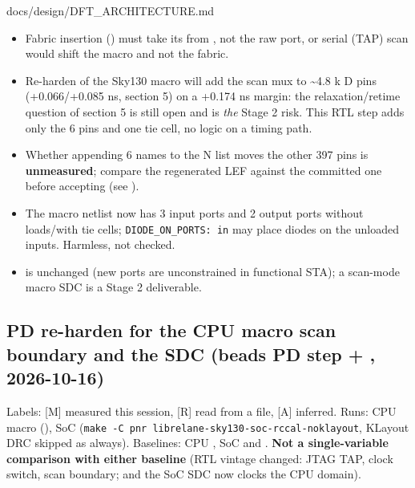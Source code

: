 \begin{relocated}{docs/design/DFT_ARCHITECTURE.md}
\begin{itemize}
\tightlist
\item
  Fabric insertion () must take its  from
  , not the raw  port, or serial (TAP)
  scan would shift the macro and not the fabric.
\item
  Re-harden of the Sky130 macro will add the scan mux to
  \textasciitilde4.8 k D pins (+0.066/\allowbreak{}+0.085 ns, section 5)
  on a +0.174 ns margin: the relaxation/\allowbreak{}retime question of
  section 5 is still open and is \emph{the} Stage 2 risk. This RTL step
  adds only the 6 pins and one tie cell, no logic on a timing path.
\item
  Whether appending 6 names to the N list moves the other 397 pins is
  \textbf{unmeasured}; compare the regenerated LEF against the committed
  one before accepting (see ).
\item
  The macro netlist now has 3 input ports and 2 output ports without
  loads/\allowbreak{}with tie cells;
  \texttt{DIODE\_\allowbreak{}ON\_\allowbreak{}PORTS:\allowbreak{}\ in}
  may place diodes on the unloaded inputs. Harmless, not checked.
\item
   is unchanged (new ports are unconstrained in
  functional STA); a scan-mode macro SDC is a Stage 2 deliverable.
\end{itemize}

\subsection{\texorpdfstring{PD re-harden for the CPU macro scan
boundary and the  SDC (beads  PD step +
,
2026-10-16)}{PD re-harden for the CPU macro scan boundary and the  SDC (beads  PD step + , 2026-10-16)}}\label{tm:ch:dft-architecture:1411-pd-re-harden-for-the-cpu-macro-scan-boundary-and-the-cpu-clk-i-sdc-beads-j41m4-pd-step-j41m5-2026-10-16}

Labels: {[}M{]} measured this session, {[}R{]} read from a file, {[}A{]}
inferred. Runs: CPU macro 
(), SoC 
(\texttt{make\ -\allowbreak{}C\ pnr\ librelane-\allowbreak{}sky130-\allowbreak{}soc-\allowbreak{}rccal-\allowbreak{}noklayout},
KLayout DRC skipped as always). Baselines: CPU
, SoC  and
. \textbf{Not a single-variable comparison
with either baseline} (RTL vintage changed: JTAG TAP, clock switch, scan
boundary; and the SoC SDC now clocks the CPU domain).


\end{relocated}
